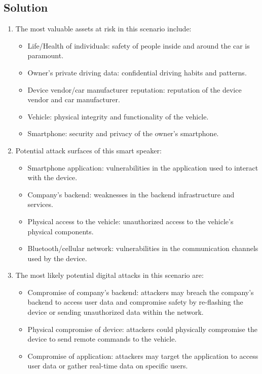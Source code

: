 \subsection*{Solution}
\begin{enumerate}
    \item The most valuable assets at risk in this scenario include:
        \begin{itemize}
            \item Life/Health of individuals: safety of people inside and around the car is paramount.
            \item Owner's private driving data: confidential driving habits and patterns.
            \item Device vendor/car manufacturer reputation: reputation of the device vendor and car manufacturer.
            \item Vehicle: physical integrity and functionality of the vehicle.
            \item Smartphone: security and privacy of the owner's smartphone.
        \end{itemize}
    \item  Potential attack surfaces of this smart speaker:
        \begin{itemize}
            \item Smartphone application: vulnerabilities in the application used to interact with the device.
            \item Company's backend: weaknesses in the backend infrastructure and services.
            \item Physical access to the vehicle: unauthorized access to the vehicle's physical components.
            \item Bluetooth/cellular network: vulnerabilities in the communication channels used by the device.
        \end{itemize}
    \item The most likely potential digital attacks in this scenario are:
        \begin{itemize}
            \item Compromise of company's backend: attackers may breach the company's backend to access user data and compromise safety by re-flashing the device or sending unauthorized data within the network.
            \item Physical compromise of device: attackers could physically compromise the device to send remote commands to the vehicle.
            \item Compromise of application: attackers may target the application to access user data or gather real-time data on specific users.
        \end{itemize}
\end{enumerate}